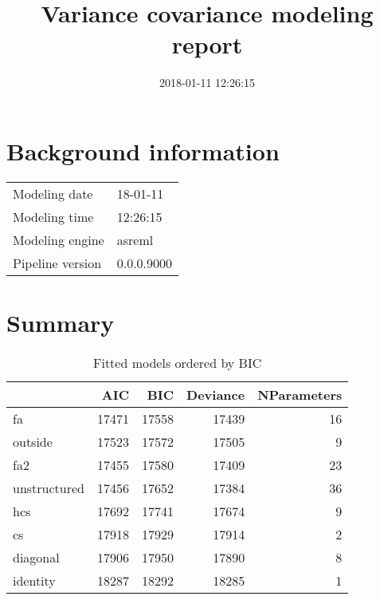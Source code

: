 \documentclass[a4paper,11pt]{article}\usepackage[]{graphicx}\usepackage[]{color}
\title{Variance covariance modeling report}%
\author{\vspace{-5ex}}
\date{2018-01-11 12:26:15}
\begin{document}


\maketitle
\singlespacing

\section{Background information}
\begin{table}[ht]
\begin{flushleft}
\begin{tabular}{ll}
  Modeling date & 18-01-11 \\ 
  Modeling time & 12:26:15 \\ 
  Modeling engine & asreml \\ 
  Pipeline version & 0.0.0.9000 \\ 
  \end{tabular}
\label{background}
\end{flushleft}
\end{table}


\section{Summary}

\begin{table}[ht]
\begin{flushleft}
\caption{Fitted models ordered by BIC} 
\label{summary}
\begin{tabular}{lrrrr}
  \hline
 & AIC & BIC & Deviance & NParameters \\ 
  \hline
fa & 17471 & 17558 & 17439 & 16 \\ 
  outside & 17523 & 17572 & 17505 & 9 \\ 
  fa2 & 17455 & 17580 & 17409 & 23 \\ 
  unstructured & 17456 & 17652 & 17384 & 36 \\ 
  hcs & 17692 & 17741 & 17674 & 9 \\ 
  cs & 17918 & 17929 & 17914 & 2 \\ 
  diagonal & 17906 & 17950 & 17890 & 8 \\ 
  identity & 18287 & 18292 & 18285 & 1 \\ 
   \hline
\end{tabular}
\end{flushleft}
\end{table}
\end{document}
